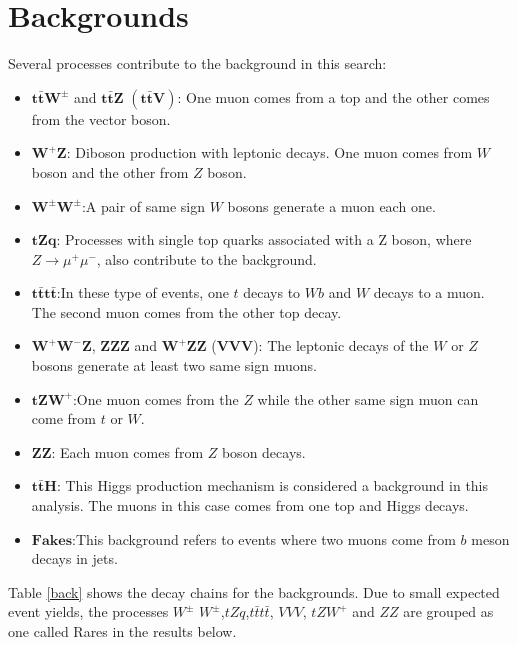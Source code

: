 \pagebreak


\section{Backgrounds}
Several processes contribute to the background in this search:
\begin{itemize}
		\item $\bm{t\bar{t}W^{\pm}}$ and $\bm{t\bar{t}Z}$ $\bm{(t\bar{t}V)}$: One muon comes from a top and the other comes from the vector boson.
			\item $\bm{W^{+}Z}$: Diboson production with leptonic decays. One muon comes from $W$ boson and the other from $Z$ boson.
		\item $\bm{W^{\pm}W^{\pm}}$:A pair of same sign $W$ bosons generate a muon each one.
		\item $\bm{tZq}$: Processes with single top quarks associated with a Z boson, where $Z\rightarrow \mu^+ \mu^-$, also contribute to the background.
	\item $\bm{t\bar{t}t\bar{t}}$:In these type of events, one $t$ decays to $Wb$ and $W$ decays to a muon. The second muon comes from the other top decay.
		\item$\bm{W^{+}W^{-}Z}$, $\bm{ZZZ}$ and $\bm{W^{+}ZZ}$ ($\bm{VVV}$): The leptonic decays of the $W$ or $Z$ bosons generate at least two same sign muons.
	\item $\bm{tZW^{+}}$:One muon comes from the $Z$ while the other same sign muon can come from $t$ or $W$. 
	\item $\bm{ZZ}$: Each muon comes from $Z$ boson decays.
			\item $\bm{t\bar{t}H}$: This Higgs production mechanism is considered a background in this analysis. The muons in this case comes from one top and Higgs decays. 
	\item $\bm{Fakes}$:This background refers to events where two muons come from $b$ meson decays in jets.
\end{itemize}
Table \ref{back} shows the decay chains for the backgrounds. Due to small expected event yields, the processes $W^\pm$ $W^\pm$,$tZq$,$t\bar{t}t\bar{t}$, $VVV$, $tZW^+$ and $ZZ$ are grouped as one called Rares in the results below.


